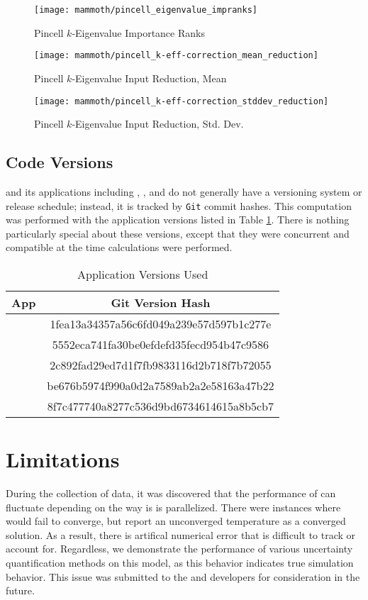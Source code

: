\begin{figure}
  \centering
  \texttt{[image: mammoth/pincell\_eigenvalue\_impranks]}
  \caption{Pincell $k$-Eigenvalue Importance Ranks}
  \label{fig:pincell impranks}
\end{figure}
\begin{figure}
  \centering
  \texttt{[image: mammoth/pincell\_k-eff-correction\_mean\_reduction]}
  \caption{Pincell $k$-Eigenvalue Input Reduction, Mean}
  \label{fig:pincell trunc mean}
\end{figure}
\begin{figure}
  \centering
  \texttt{[image: mammoth/pincell\_k-eff-correction\_stddev\_reduction]}
  \caption{Pincell $k$-Eigenvalue Input Reduction, Std. Dev.}
  \label{fig:pincell trunc mean}
\end{figure}

\subsection{Code Versions}
\moose{} and its applications including \rattlesnake{}, \bison{}, and \mammoth{} do not generally have a
versioning system or release
schedule; instead, it is tracked by \texttt{Git} \cite{git} commit hashes.
This computation was performed with the application versions listed in Table \ref{tab:git}.  There is nothing
particularly special about these versions, except that they were concurrent and compatible at the time
calculations were performed.
\begin{table}
  \centering
  \begin{tabular}{c c}
    App & Git Version Hash \\ \hline
    \moose{ } & 1fea13a34357a56c6fd049a239e57d597b1c277e\\
    \bison{ } & 5552eca741fa30be0efdefd35fecd954b47c9586\\
    \rattlesnake{ } & 2c892fad29ed7d1f7fb9833116d2b718f7b72055\\
    \mammoth{ } & be676b5974f990a0d2a7589ab2a2e58163a47b22 \\ \hline
    \raven{ } & 8f7c477740a8277c536d9bd6734614615a8b5cb7
  \end{tabular}
  \caption{Application Versions Used}
  \label{tab:git}
\end{table}

\section{Limitations}
During the collection of data, it was discovered that the performance of \bison{} can fluctuate depending on
the way is is parallelized.  There were instances where \bison{} would fail to converge, but report an unconverged
temperature as a converged solution.  As a result, there is artifical numerical error that is difficult to track or
account for.  Regardless, we demonstrate the performance of various uncertainty quantification methods on this model, 
as this behavior indicates true simulation behavior.  This issue was submitted to the \bison{} and \mammoth{}
developers for consideration in the future.

